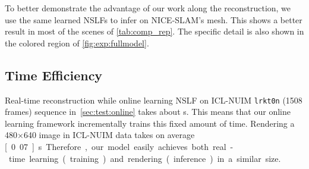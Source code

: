 To better demonstrate the advantage of our work along the reconstruction, we use the same learned NSLFs to infer on NICE-SLAM's mesh.
This shows a better result in most of the scenes of \cref{tab:comp_rep}. The specific detail is also shown in the colored region of \cref{fig:exp:fullmodel}. 
\vspace{-.2cm}
\subsection{Time Efficiency}
Real-time reconstruction while online learning NSLF on ICL-NUIM \texttt{lrkt0n} (1508 frames) sequence in~\cref{sec:test:online} takes about \unit[28]{s}.
This means that our online learning framework incrementally trains this fixed amount of time.
Rendering a 480$\times$640 image in ICL-NUIM data takes on average \unit[0.07]{s}. %
Therefore, our model easily achieves both real-time learning (training) and rendering (inference) in a similar size.
